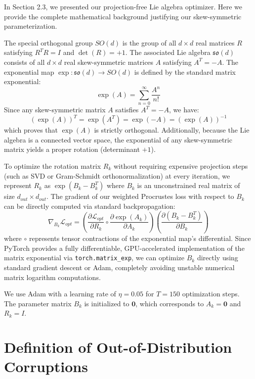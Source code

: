 \documentclass{article}
\theoremstyle{plain}
\theoremstyle{definition}
\theoremstyle{remark}
\begin{document}
In Section 2.3, we presented our projection-free Lie algebra optimizer. Here we provide the complete mathematical background justifying our skew-symmetric parameterization.

The special orthogonal group $SO(d)$ is the group of all $d \times d$ real matrices $R$ satisfying $R^T R = I$ and $\det(R) = +1$. The associated Lie algebra $\mathfrak{so}(d)$ consists of all $d \times d$ real skew-symmetric matrices $A$ satisfying $A^T = -A$. The exponential map $\exp: \mathfrak{so}(d) \to SO(d)$ is defined by the standard matrix exponential:
\begin{equation}
    \exp(A) = \sum_{n=0}^\infty \frac{A^n}{n!}
\end{equation}
Since any skew-symmetric matrix $A$ satisfies $A^T = -A$, we have:
\begin{equation}
    \left(\exp(A)\right)^T = \exp(A^T) = \exp(-A) = \left(\exp(A)\right)^{-1}
\end{equation}
which proves that $\exp(A)$ is strictly orthogonal. Additionally, because the Lie algebra is a connected vector space, the exponential of any skew-symmetric matrix yields a proper rotation (determinant $+1$).

To optimize the rotation matrix $R_k$ without requiring expensive projection steps (such as SVD or Gram-Schmidt orthonormalization) at every iteration, we represent $R_k$ as $\exp(B_k - B_k^T)$ where $B_k$ is an unconstrained real matrix of size $d_{out} \times d_{out}$. The gradient of our weighted Procrustes loss with respect to $B_k$ can be directly computed via standard backpropagation:
\begin{equation}
    \nabla_{B_k} \mathcal{L}_{opt} = \left(\frac{\partial \mathcal{L}_{opt}}{\partial R_k} \circ \frac{\partial \exp(A_k)}{\partial A_k}\right) \left( \frac{\partial(B_k - B_k^T)}{\partial B_k} \right)
\end{equation}
where $\circ$ represents tensor contractions of the exponential map's differential. Since PyTorch provides a fully differentiable, GPU-accelerated implementation of the matrix exponential via \texttt{torch.matrix\_exp}, we can optimize $B_k$ directly using standard gradient descent or Adam, completely avoiding unstable numerical matrix logarithm computations.

We use Adam with a learning rate of $\eta = 0.05$ for $T = 150$ optimization steps. The parameter matrix $B_k$ is initialized to $\mathbf{0}$, which corresponds to $A_k = \mathbf{0}$ and $R_k = I$.

\section{Definition of Out-of-Distribution Corruptions}
\label{app:corruptions}
\end{document}
